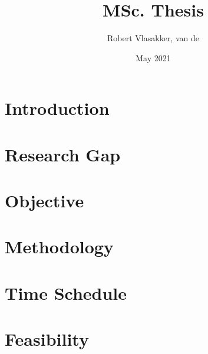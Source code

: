 \documentclass{article}
\title{MSc. Thesis}
\author{Robert Vlasakker, van de}
\date{May 2021}
\begin{document}
\maketitle

\section{Introduction}
\section{Research Gap}
\section{Objective}
\section{Methodology}
\section{Time Schedule}
\section{Feasibility}
\end{document}

